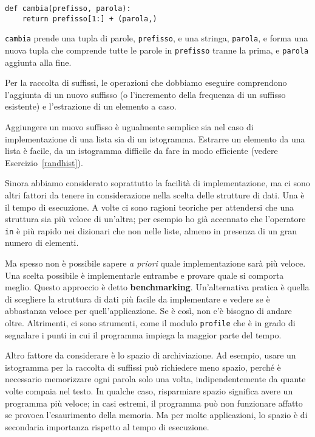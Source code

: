 \documentclass[10pt]{book}
\begin{document}
\begin{verbatim}
def cambia(prefisso, parola):
    return prefisso[1:] + (parola,)
\end{verbatim}
%
{\tt cambia} prende una tupla di parole, {\tt prefisso}, e una stringa, 
{\tt parola}, e forma una nuova tupla che comprende tutte le parole
in {\tt prefisso} tranne la prima, e {\tt parola} aggiunta alla fine.

Per la raccolta di suffissi, le operazioni che dobbiamo eseguire comprendono l'aggiunta di un nuovo suffisso (o l'incremento della frequenza di un suffisso esistente) e l'estrazione di un elemento a caso.

Aggiungere un nuovo suffisso è ugualmente semplice sia nel caso di implementazione di una lista sia di un istogramma. Estrarre un elemento da una lista è facile, da un istogramma difficile da fare in modo efficiente (vedere Esercizio~\ref{randhist}).

Sinora abbiamo considerato soprattutto la facilità di implementazione, ma ci sono altri fattori da tenere in considerazione nella scelta delle strutture di dati. Una è il tempo di esecuzione. A volte ci sono ragioni teoriche per attendersi che una struttura sia più veloce di un'altra; per esempio ho già accennato che l'operatore {\tt in} è più rapido nei dizionari che non nelle liste, almeno in presenza di un gran numero di elementi.

Ma spesso non è possibile sapere {\em a priori} quale implementazione sarà più veloce. Una scelta possibile è implementarle entrambe e provare quale si comporta meglio. Questo approccio è detto {\bf benchmarking}.  Un'alternativa pratica è quella di scegliere la struttura di dati più facile da implementare e vedere se è abbastanza veloce per quell'applicazione. Se è così, non c'è bisogno di andare oltre. Altrimenti, ci sono strumenti, come il modulo {\tt profile} che è in grado di segnalare i punti in cui il programma impiega la maggior parte del tempo.

Altro fattore da considerare è lo spazio di archiviazione. Ad esempio, usare un istogramma per la raccolta di suffissi può richiedere meno spazio, perché è necessario memorizzare ogni parola solo una volta, indipendentemente da quante volte compaia nel testo. In qualche caso, risparmiare spazio significa avere un programma più veloce; in casi estremi, il programma può non funzionare affatto se provoca l'esaurimento della memoria. Ma per molte applicazioni, lo spazio è di secondaria importanza rispetto al tempo di esecuzione.
\end{document}
